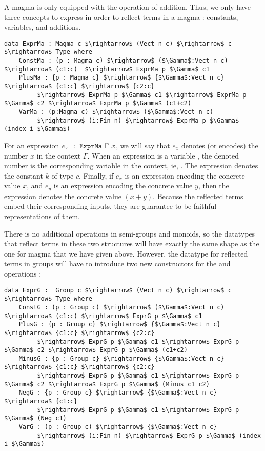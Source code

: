 A magma is only equipped with the operation of addition. Thus, we only have three concepts to express in order to reflect terms in a magma : constants, variables, and additions.

\begin{lstlisting}
data ExprMa : Magma c $\rightarrow$ (Vect n c) $\rightarrow$ c $\rightarrow$ Type where
    ConstMa : (p : Magma c) $\rightarrow$ ($\Gamma$:Vect n c) $\rightarrow$ (c1:c)  $\rightarrow$ ExprMa p $\Gamma$ c1 
    PlusMa : {p : Magma c} $\rightarrow$ {$\Gamma$:Vect n c} $\rightarrow$ {c1:c} $\rightarrow$ {c2:c} 
         $\rightarrow$ ExprMa p $\Gamma$ c1 $\rightarrow$ ExprMa p $\Gamma$ c2 $\rightarrow$ ExprMa p $\Gamma$ (c1+c2) 
    VarMa : (p:Magma c) $\rightarrow$ ($\Gamma$:Vect n c)
         $\rightarrow$ (i:Fin n) $\rightarrow$ ExprMa p $\Gamma$ (index i $\Gamma$)
\end{lstlisting}


For an expression $e_x\ :\ \code{ExprMa}\ \Gamma\ x$, we will say that $e_x$ denotes (or encodes) the number $x$ in the context $\Gamma$.
When an expression is a variable , the denoted number is the corresponding variable in the context, ie, .
The expression  denotes the constant $k$ of type $c$. Finally, if $e_x$ is an expression encoding the concrete value $x$, and $e_y$ is an expression encoding the concrete value $y$, then the expression  denotes the concrete value $(x + y)$. Because the reflected terms embed their corresponding inputs, they are guarantee to be faithful representations of them.

There is no additional operations in semi-groups and monoids, so the datatypes that reflect terms in these two structures will have exactly the same shape as the one for magma that we have given above.
However, the datatype for reflected terms in groups will have to introduce two new constructors for the  and  operations :

\begin{lstlisting}
data ExprG :  Group c $\rightarrow$ (Vect n c) $\rightarrow$ c $\rightarrow$ Type where
    ConstG : (p : Group c) $\rightarrow$ ($\Gamma$:Vect n c) $\rightarrow$ (c1:c) $\rightarrow$ ExprG p $\Gamma$ c1
    PlusG : {p : Group c} $\rightarrow$ {$\Gamma$:Vect n c} $\rightarrow$ {c1:c} $\rightarrow$ {c2:c} 
         $\rightarrow$ ExprG p $\Gamma$ c1 $\rightarrow$ ExprG p $\Gamma$ c2 $\rightarrow$ ExprG p $\Gamma$ (c1+c2)
    MinusG : {p : Group c} $\rightarrow$ {$\Gamma$:Vect n c} $\rightarrow$ {c1:c} $\rightarrow$ {c2:c} 
         $\rightarrow$ ExprG p $\Gamma$ c1 $\rightarrow$ ExprG p $\Gamma$ c2 $\rightarrow$ ExprG p $\Gamma$ (Minus c1 c2)
    NegG : {p : Group c} $\rightarrow$ {$\Gamma$:Vect n c} $\rightarrow$ {c1:c} 
         $\rightarrow$ ExprG p $\Gamma$ c1 $\rightarrow$ ExprG p $\Gamma$ (Neg c1)
    VarG : (p : Group c) $\rightarrow$ {$\Gamma$:Vect n c} 
         $\rightarrow$ (i:Fin n) $\rightarrow$ ExprG p $\Gamma$ (index i $\Gamma$)
\end{lstlisting}


